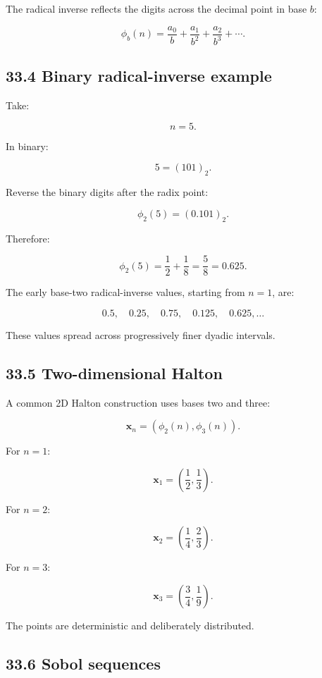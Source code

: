 The radical inverse reflects the digits across the decimal point in base \(b\):

\[ \boxed{ \phi_b(n)= \frac{a_0}{b}+ \frac{a_1}{b^2}+ \frac{a_2}{b^3}+\cdots }. \]

\subsection{33.4 Binary radical-inverse example}\label{02-foundations-ii-ch031-binary-radical-inverse-example}

Take:

\[ n=5. \]

In binary:

\[ 5=(101)_2. \]

Reverse the binary digits after the radix point:

\[ \phi_2(5)=(0.101)_2. \]

Therefore:

\[ \boxed{ \phi_2(5)=\frac12+\frac18=\frac58=0.625 }. \]

The early base-two radical-inverse values, starting from \(n=1\), are:

\[ 0.5,\quad0.25,\quad0.75,\quad0.125,\quad0.625,\ldots \]

These values spread across progressively finer dyadic intervals.

\subsection{33.5 Two-dimensional Halton}\label{02-foundations-ii-ch031-two-dimensional-halton}

A common 2D Halton construction uses bases two and three:

\[ \boxed{ \mathbf x_n= (\phi_2(n),\phi_3(n)) }. \]

For \(n=1\):

\[ \boxed{ \mathbf x_1= \left(\frac12,\frac13\right) }. \]

For \(n=2\):

\[ \boxed{ \mathbf x_2= \left(\frac14,\frac23\right) }. \]

For \(n=3\):

\[ \boxed{ \mathbf x_3= \left(\frac34,\frac19\right) }. \]

The points are deterministic and deliberately distributed.

\subsection{33.6 Sobol sequences}\label{02-foundations-ii-ch031-sobol-sequences}

